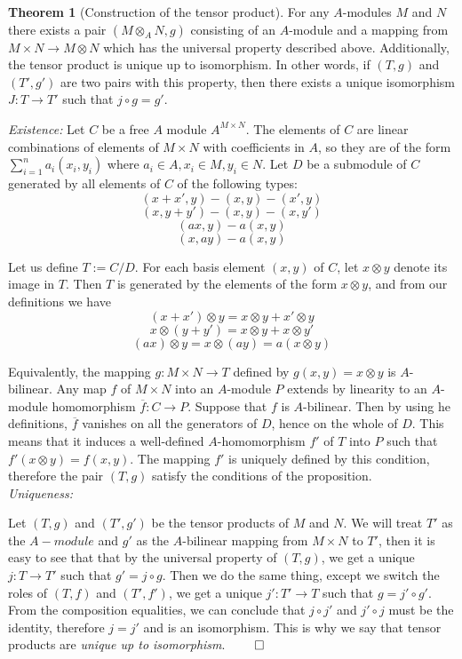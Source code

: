 \documentclass[11pt]{article}
\theoremstyle{definition}
\newtheorem{theorem}{Theorem}[section]
\begin{document}
\begin{theorem}[Construction of the tensor product]
For any $A$-modules $M$ and $N$ there exists a pair $(M\otimes_A N,g)$ consisting of an $A$-module and a mapping from $M\times N\rightarrow M\otimes N$ which has the universal property described above. Additionally, the tensor product is unique up to isomorphism. In other words, if $(T,g)$ and $(T',g')$ are two pairs with this property, then there exists a unique isomorphism $J:T\rightarrow T'$ such that $j\circ g=g'$.
\end{theorem}
\proof 

\textit{Existence:}
    Let $C$ be a free $A$ module $A^{M\times N}$. The elements of $C$ are linear combinations of elements of $M\times N$ with coefficients in $A$, so they are of the form $\sum_{i=1}^{n}a_i(x_i,y_i)$ where $a_i\in A,x_i\in M,y_i\in N$. Let $D$ be a submodule of $C$ generated by all elements of $C$ of the following types:
    $$(x+x',y)-(x,y)-(x',y) $$
    $$(x,y+y')-(x,y)-(x,y') $$
    $$(ax,y)-a(x,y) $$
    $$(x,ay)-a(x,y) $$
    
    Let us define $T:=C/D$. For each basis element $(x,y)$ of $C$, let $x\otimes y$ denote its image in $T$. Then $T$ is generated by the elements of the form $x\otimes y$, and from our definitions we have 
    $$(x+x')\otimes y=x\otimes y+x'\otimes y $$
    $$x\otimes(y+y')=x\otimes y+x\otimes y' $$
    $$(ax)\otimes y=x\otimes (ay)=a(x\otimes y) $$
    
    Equivalently, the mapping $g:M\times N\rightarrow T$ defined by $g(x,y)=x\otimes y$ is $A$-bilinear.
    Any map $f$ of $M\times N$ into an $A$-module $P$ extends by linearity to an $A$-module homomorphism $\overline{f}:C\rightarrow P$. Suppose that $f$ is $A$-bilinear. Then by using he definitions, $\overline{f}$ vanishes on all the generators of $D$, hence on the whole of $D$. This means that it induces a well-defined $A$-homomorphism $f'$ of $T$ into $P$ such that $f'(x\otimes y)=f(x,y)$. The mapping $f'$ is uniquely defined by this condition, therefore the pair $(T,g)$ satisfy the conditions of the proposition. \\
   
\textit{Uniqueness:}
    
    Let $(T,g)$ and $(T',g')$ be the tensor products of $M$ and $N$. We will treat $T'$ as the $A-module$ and $g'$ as the $A$-bilinear mapping from $M\times N$ to $T'$, then it is easy to see that that by the universal property of $(T,g)$, we get a unique $j:T\rightarrow T'$ such that $g'=j\circ g$. Then we do the same thing, except we switch the roles of $(T,f)$ and $(T',f')$, we get a unique $j': T'\rightarrow T$ such that $g=j'\circ g'$. From the composition equalities, we can conclude that $j\circ j'$ and $j'\circ j$ must be the identity, therefore $j=j'$ and is an isomorphism. This is why we say that tensor products are \textit{unique up to isomorphism}.
 $\qed$\\
 
\end{document}
